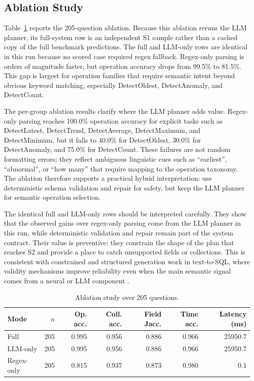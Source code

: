 \documentclass[11pt]{article}
\begin{document}
\FloatBarrier

\subsection{Ablation Study}

Table~\ref{tab:ablation} reports the 205-question ablation. Because this ablation reruns the LLM planner, its full-system row is an independent S1 sample rather than a cached copy of the full benchmark predictions. The full and LLM-only rows are identical in this run because no scored case required regex fallback. Regex-only parsing is orders of magnitude faster, but operation accuracy drops from 99.5\% to 81.5\%. This gap is largest for operation families that require semantic intent beyond obvious keyword matching, especially DetectOldest, DetectAnomaly, and DetectCount.

The per-group ablation results clarify where the LLM planner adds value. Regex-only parsing reaches 100.0\% operation accuracy for explicit tasks such as DetectLatest, DetectTrend, DetectAverage, DetectMaximum, and DetectMinimum, but it falls to 40.0\% for DetectOldest, 30.0\% for DetectAnomaly, and 75.0\% for DetectCount. These failures are not random formatting errors; they reflect ambiguous linguistic cues such as ``earliest'', ``abnormal'', or ``how many'' that require mapping to the operation taxonomy. The ablation therefore supports a practical hybrid interpretation: use deterministic schema validation and repair for safety, but keep the LLM planner for semantic operation selection.

The identical full and LLM-only rows should be interpreted carefully. They show that the observed gains over regex-only parsing come from the LLM planner in this run, while deterministic validation and repair remain part of the system contract. Their value is preventive: they constrain the shape of the plan that reaches S2 and provide a place to catch unsupported fields or collections. This is consistent with constrained and structured generation work in text-to-SQL, where validity mechanisms improve reliability even when the main semantic signal comes from a neural or LLM component \cite{scholak2021picard,hong2024survey}.

\begin{table}[!htbp]
\centering
\scriptsize
\caption{Ablation study over 205 questions.}
\label{tab:ablation}
\begin{tabular}{lrrrrrr}
\toprule
Mode & $n$ & Op. acc. & Coll. acc. & Field Jacc. & Time acc. & Latency (ms) \\
\midrule
Full & 205 & 0.995 & 0.956 & 0.886 & 0.966 & 25950.7 \\
LLM-only & 205 & 0.995 & 0.956 & 0.886 & 0.966 & 25950.7 \\
Regex-only & 205 & 0.815 & 0.937 & 0.873 & 0.980 & 0.1 \\
\bottomrule
\end{tabular}
\end{table}
\end{document}
